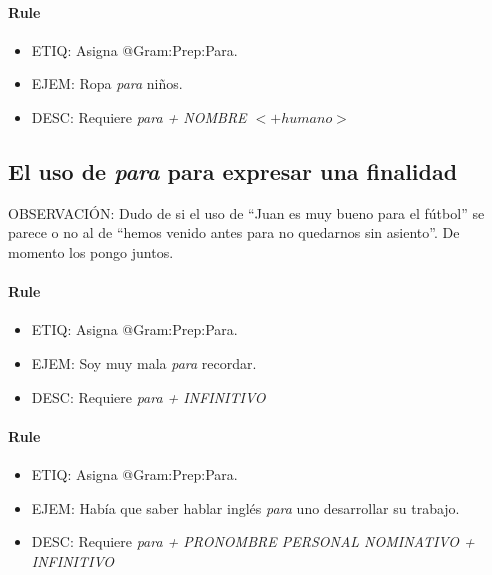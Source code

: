 \documentclass[11pt]{report}
\begin{document}
\paragraph*{Rule}
\begin{itemize}
\item ETIQ: Asigna @Gram:Prep:Para.
\item EJEM: Ropa \emph{para} niños.
\item DESC: Requiere \emph{para + NOMBRE $<+humano>$}
\end{itemize}

\subsection{El uso de \emph{para} para expresar una finalidad}
OBSERVACIÓN: Dudo de si el uso de ``Juan es muy bueno para el fútbol'' se parece o no al de ``hemos venido antes para no quedarnos sin asiento''. De momento los pongo juntos.

\paragraph*{Rule}
\begin{itemize}
\item ETIQ: Asigna @Gram:Prep:Para.
\item EJEM: Soy muy mala \emph{para} recordar.
\item DESC: Requiere \emph{para + INFINITIVO}
\end{itemize}

\paragraph*{Rule}
\begin{itemize}
\item ETIQ: Asigna @Gram:Prep:Para.
\item EJEM: Había que saber hablar inglés \emph{para} uno desarrollar su trabajo.
\item DESC: Requiere \emph{para + PRONOMBRE PERSONAL NOMINATIVO + INFINITIVO}
\end{itemize}
\end{document}
